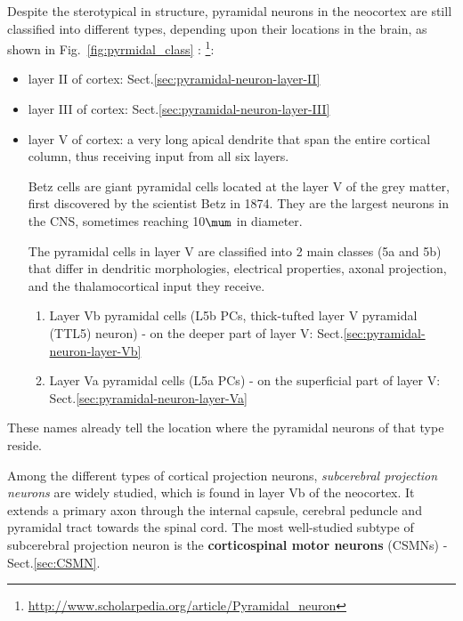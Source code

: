 Despite the sterotypical in structure, pyramidal neurons in the neocortex are
still classified into different types, depending upon their locations in the
brain, as shown in Fig.~\ref{fig:pyrmidal_class} \citep{spruston2008}:
\footnote{\url{http://www.scholarpedia.org/article/Pyramidal_neuron}}:
\begin{itemize}
  \item layer II of cortex: Sect.\ref{sec:pyramidal-neuron-layer-II}

  \item layer III of cortex: Sect.\ref{sec:pyramidal-neuron-layer-III}
  

  \item layer V of cortex: a very long apical dendrite that span
  the entire cortical column, thus receiving input from all six layers. 
  
  Betz cells are giant pyramidal cells located at the layer V of the grey
  matter, first discovered by the scientist Betz in 1874. They are the largest
  neurons in the CNS, sometimes reaching 10$\mum$ in diameter.  
  
  The pyramidal cells in layer V are classified into 2 main classes (5a and 5b)
  that differ in dendritic morphologies, electrical properties, axonal
  projection, and the thalamocortical input they receive.

  \begin{enumerate}
    
    \item Layer Vb pyramidal cells (L5b PCs, thick-tufted layer V pyramidal
    (TTL5) neuron) - on the deeper part of layer V:
    Sect.\ref{sec:pyramidal-neuron-layer-Vb}
    
    \item Layer Va pyramidal cells (L5a PCs) - on the superficial part of layer
    V:   Sect.\ref{sec:pyramidal-neuron-layer-Va}
  \end{enumerate}

\end{itemize}
These names already tell the location where the pyramidal neurons of that type
reside.

Among the different types of cortical projection neurons, {\it subcerebral
projection neurons} are widely studied, which is found in layer Vb of the
neocortex. It extends a primary axon through the internal capsule, cerebral
peduncle and pyramidal tract towards the spinal cord. The most well-studied
subtype of subcerebral projection neuron is the {\bf corticospinal motor
neurons} (CSMNs) - Sect.\ref{sec:CSMN}.



